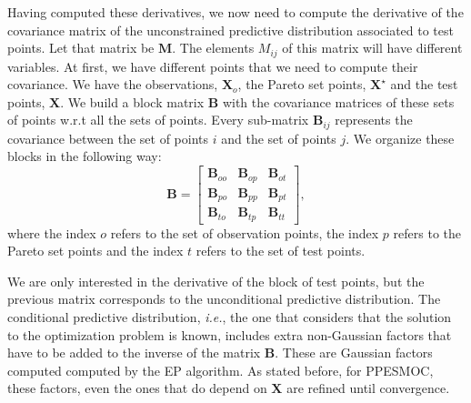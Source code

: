 Having computed these derivatives, we now need to compute the derivative of the covariance matrix of the unconstrained predictive distribution associated to test points. Let that matrix be $\mathbf{M}$. The elements $M_{ij}$ of this matrix will have different variables. At first, we have different points that we need to compute their covariance. We have the observations, $\mathbf{X}_o$, the Pareto set points, $\mathbf{X}^\star$ and the test points, $\mathbf{X}$. We build a block matrix $\mathbf{B}$ with the covariance matrices of these sets of points w.r.t all the sets of points. Every sub-matrix $\mathbf{B}_{ij}$ represents the covariance between the set of points $i$ and the set of points $j$. We organize these blocks in the following way:
\[
\mathbf{B}=
\left[
\begin{array}{c|c|c}
\mathbf{B}_{oo} & \mathbf{B}_{op} & \mathbf{B}_{ot}\\
\hline
\mathbf{B}_{po} & \mathbf{B}_{pp} & \mathbf{B}_{pt}\\
\hline
\mathbf{B}_{to} & \mathbf{B}_{tp} & \mathbf{B}_{tt}
\end{array}
\right],
\]
where the index $o$ refers to the set of observation points, the index $p$ refers to the Pareto set points and the index $t$ refers to the set of test points.

We are only interested in the derivative of the block of test points, but the previous matrix corresponds to the unconditional predictive distribution. The conditional predictive distribution, \emph{i.e.}, the one that considers that the solution to the optimization problem is known, includes extra non-Gaussian factors that have to be added to the inverse of the matrix $\mathbf{B}$. These are Gaussian factors computed computed by the EP algorithm. As stated before, for PPESMOC, these factors, even the ones that do depend on $\mathbf{X}$ are refined until convergence.


